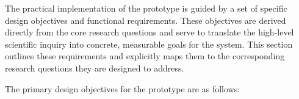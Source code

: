 

The practical implementation of the prototype is guided by a set of specific design objectives and functional requirements. These objectives are derived directly from the core research questions and serve to translate the high-level scientific inquiry into concrete, measurable goals for the system. This section outlines these requirements and explicitly maps them to the corresponding research questions they are designed to address.

The primary design objectives for the prototype are as follows:

